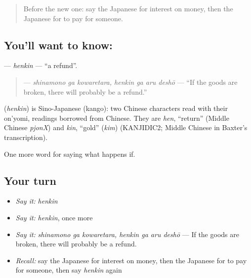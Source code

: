 \label{lesson:JA-C359-henkin}



\begin{quote}
Before the new one: say the Japanese for interest on money, then the Japanese for to pay for someone.
\end{quote}

\subsection*{You'll want to know: }
\textbf{} — \emph{henkin} — \textquotedblleft{}a refund\textquotedblright{}.

\begin{quote}
\textbf{  } — \emph{shinamono ga kowaretara, henkin ga aru deshō} — \textquotedblleft{}If the goods are broken, there will probably be a refund.\textquotedblright{}
\end{quote}

\begin{cousinweb}
\textbf{} (\emph{henkin}) is Sino-Japanese (kango): two Chinese characters read with their on'yomi, readings borrowed from Chinese. They are \emph{hen}, \textquotedblleft{}return\textquotedblright{} (Middle Chinese \emph{pjonX}) and \emph{kin}, \textquotedblleft{}gold\textquotedblright{} (\emph{kim}) (KANJIDIC2; Middle Chinese in Baxter's transcription).
\end{cousinweb}

\begin{grammarlens}[title={What you've built}]
One more word for saying what happens if.
\end{grammarlens}

\subsection*{Your turn}
\begin{itemize}
\raggedright
  \item \emph{Say it:} \emph{henkin}
  \item \emph{Say it:} \emph{henkin}, once more
  \item \emph{Say it:} \emph{shinamono ga kowaretara, henkin ga aru deshō} — If the goods are broken, there will probably be a refund.
  \item \emph{Recall:} say the Japanese for interest on money, then the Japanese for to pay for someone, then say \emph{henkin} again
\end{itemize}

